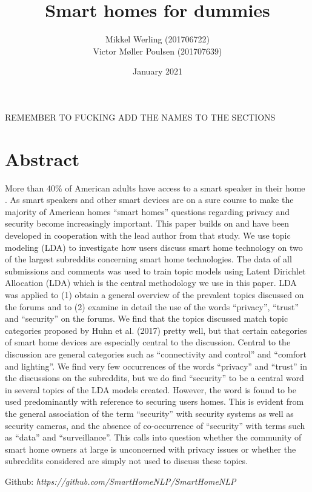 \documentclass{article}
\title{Smart homes for dummies}
\author{Mikkel Werling (201706722) \\ Victor Møller Poulsen (201707639)}
\date{January 2021}
\begin{document}
    \maketitle
    REMEMBER TO FUCKING ADD THE NAMES TO THE SECTIONS 
    \section{Abstract}
    More than 40\% of American adults have access to a smart speaker in their home \cite{perez_smart_2018}. As smart speakers and other smart devices are on a sure course to make the majority of American homes “smart homes” questions regarding privacy and security become increasingly important. This paper builds on  and have been developed in cooperation with the lead author from that study. We use topic modeling (LDA) to investigate how users discuss smart home technology on two of the largest subreddits concerning smart home technologies. The data of all submissions and comments was used to train topic models using Latent Dirichlet Allocation (LDA) which is the central methodology we use in this paper. LDA was applied to (1) obtain a general overview of the prevalent topics discussed on the forums and to (2) examine in detail the use of the words “privacy”, “trust” and “security” on the forums. We find that the topics discussed match topic categories proposed by Huhn et al. (2017) pretty well, but that certain categories of smart home devices are especially central to the discussion. Central to the discussion are general categories such as “connectivity and control” and “comfort and lighting”. We find very few occurrences of the words “privacy” and “trust” in the discussions on the subreddits, but we do find “security” to be a central word in several topics of the LDA models created. However, the word is found to be used predominantly with reference to securing users homes. This is evident from the general association of the term “security” with security systems as well as security cameras, and the absence of co-occurrence of “security” with terms such as “data” and “surveillance”. This calls into question whether the community of smart home owners at large is unconcerned with privacy issues or whether the subreddits considered are simply not used to discuss these topics.

    \begin{center}
    Github: \textit{https://github.com/SmartHomeNLP/SmartHomeNLP}
\end{center}
\end{document}
